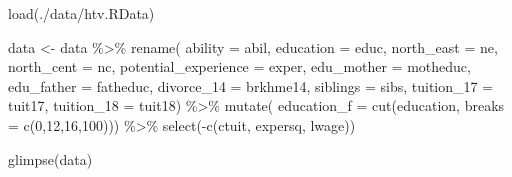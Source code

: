 \documentclass[
]{book}
\newenvironment{Shaded}{\begin{snugshade}}{\end{snugshade}}
\newcommand{\AttributeTok}[1]{\textcolor[rgb]{0.77,0.63,0.00}{#1}}
\newcommand{\DecValTok}[1]{\textcolor[rgb]{0.00,0.00,0.81}{#1}}
\newcommand{\FunctionTok}[1]{\textcolor[rgb]{0.00,0.00,0.00}{#1}}
\newcommand{\NormalTok}[1]{#1}
\newcommand{\OtherTok}[1]{\textcolor[rgb]{0.56,0.35,0.01}{#1}}
\newcommand{\SpecialCharTok}[1]{\textcolor[rgb]{0.00,0.00,0.00}{#1}}
\newcommand{\StringTok}[1]{\textcolor[rgb]{0.31,0.60,0.02}{#1}}
\theoremstyle{definition}
\theoremstyle{definition}
\theoremstyle{definition}
\theoremstyle{definition}
\theoremstyle{remark}
\begin{document}
\begin{Shaded}
\begin{Highlighting}[]
\FunctionTok{load}\NormalTok{(}\StringTok{\textquotesingle{}./data/htv.RData\textquotesingle{}}\NormalTok{)}

\NormalTok{data }\OtherTok{\textless{}{-}}\NormalTok{ data }\SpecialCharTok{\%\textgreater{}\%} 
  \FunctionTok{rename}\NormalTok{(}
    \AttributeTok{ability    =}\NormalTok{ abil, }
    \AttributeTok{education  =}\NormalTok{ educ, }
    \AttributeTok{north\_east =}\NormalTok{ ne, }
    \AttributeTok{north\_cent =}\NormalTok{ nc, }
    \AttributeTok{potential\_experience =}\NormalTok{ exper, }
    \AttributeTok{edu\_mother =}\NormalTok{ motheduc, }
    \AttributeTok{edu\_father =}\NormalTok{ fatheduc, }
    \AttributeTok{divorce\_14 =}\NormalTok{ brkhme14, }
    \AttributeTok{siblings   =}\NormalTok{ sibs, }
    \AttributeTok{tuition\_17 =}\NormalTok{ tuit17, }
    \AttributeTok{tuition\_18 =}\NormalTok{ tuit18) }\SpecialCharTok{\%\textgreater{}\%} 
  \FunctionTok{mutate}\NormalTok{(}
    \AttributeTok{education\_f =} \FunctionTok{cut}\NormalTok{(education, }\AttributeTok{breaks =} \FunctionTok{c}\NormalTok{(}\DecValTok{0}\NormalTok{,}\DecValTok{12}\NormalTok{,}\DecValTok{16}\NormalTok{,}\DecValTok{100}\NormalTok{))) }\SpecialCharTok{\%\textgreater{}\%}
  \FunctionTok{select}\NormalTok{(}\SpecialCharTok{{-}}\FunctionTok{c}\NormalTok{(ctuit, expersq, lwage))}
  
\FunctionTok{glimpse}\NormalTok{(data)}
\end{Highlighting}
\end{Shaded}
\end{document}
